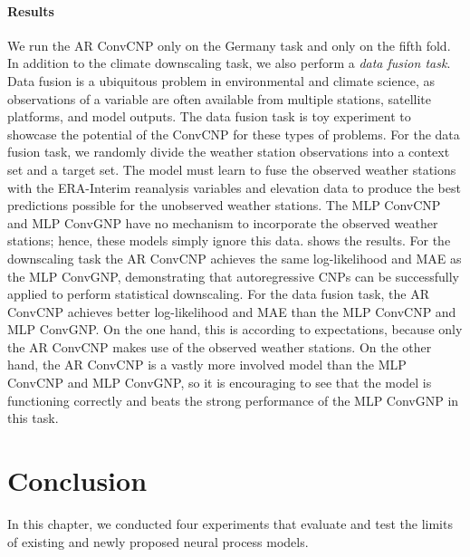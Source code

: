\documentclass[12pt, twoside]{report}
\begin{document}
\paragraph{Results}
We run the AR ConvCNP only on the Germany task and only on the fifth fold.
In addition to the climate downscaling task,
we also perform a \emph{data fusion task}.
Data fusion is a ubiquitous problem in environmental and climate science,
as observations of a variable are often available from multiple stations, satellite platforms, and model outputs.
The data fusion task is toy experiment to showcase the potential of the ConvCNP for these types of problems.
For the data fusion task, we randomly divide the weather station observations into a context set and a target set.
The model must learn to fuse the observed weather stations with the ERA-Interim reanalysis variables and elevation data to produce the best predictions possible for the unobserved weather stations.
The MLP ConvCNP and MLP ConvGNP have no mechanism to incorporate the observed weather stations;
hence, these models simply ignore this data.
 shows the results.
For the downscaling task the AR ConvCNP achieves the same log-likelihood and MAE as the MLP ConvGNP,
demonstrating that autoregressive CNPs can be successfully applied to perform statistical downscaling.
For the data fusion task, the AR ConvCNP achieves better log-likelihood and MAE than the MLP ConvCNP and MLP ConvGNP.
On the one hand, this is according to expectations, because only the AR ConvCNP makes use of the observed weather stations.
On the other hand, the AR ConvCNP is a vastly more involved model than the MLP ConvCNP and MLP ConvGNP,
so it is encouraging to see that the model is functioning correctly and beats the strong performance of the MLP ConvGNP in this task.

\section{Conclusion}
\label{sec:experiments:conclusion}

In this chapter, we conducted four experiments that evaluate and test the limits of existing and newly proposed neural process models.
\end{document}

